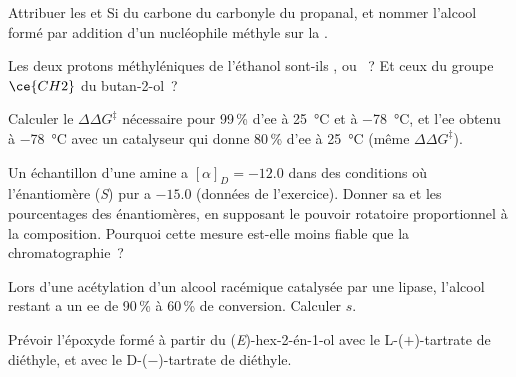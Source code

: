 \begin{exercise}[$\star$]\label{exo:b3:asymmetric-synthesis:3}
Attribuer les  et Si du carbone du carbonyle du propanal, et
nommer l'alcool formé par addition d'un nucléophile méthyle sur la .
\end{exercise}

\begin{exercise}[$\star$]\label{exo:b3:asymmetric-synthesis:4}
Les deux protons méthyléniques de l'éthanol sont-ils ,  ou ~?
Et ceux du groupe $\ce{CH2}$ du butan-2-ol~?
\end{exercise}

\begin{exercise}[$\star\star$]\label{exo:b3:asymmetric-synthesis:5}
Calculer le $\Delta\Delta G^\ddagger$ nécessaire pour 99\,\% d'ee à \qty{25}{\celsius} et à \qty{-78}{\celsius}, et l'ee obtenu à \qty{-78}{\celsius}
avec un catalyseur qui donne 80\,\% d'ee à \qty{25}{\celsius} (même $\Delta\Delta G^\ddagger$).
\end{exercise}

\begin{exercise}[$\star\star$]\label{exo:b3:asymmetric-synthesis:6}
Un échantillon d'une amine a $[\alpha]_D = -12.0$ dans des conditions où l'énantiomère (\textit{S}) pur
a $-15.0$ (données de l'exercice). Donner sa  et les
pourcentages des énantiomères, en supposant le pouvoir rotatoire
proportionnel à la composition. Pourquoi cette mesure est-elle moins
fiable que la chromatographie~?
\end{exercise}

\begin{exercise}[$\star\star$]\label{exo:b3:asymmetric-synthesis:7}
Lors d'une acétylation d'un alcool racémique catalysée par une lipase,
l'alcool restant a un ee de 90\,\% à 60\,\% de conversion. Calculer $s$.
\end{exercise}

\begin{exercise}[$\star\star$]\label{exo:b3:asymmetric-synthesis:8}
Prévoir l'époxyde formé à partir du (\textit{E})-hex-2-én-1-ol avec le L-($+$)-tartrate de diéthyle, et avec le
D-($-$)-tartrate de diéthyle.
\end{exercise}

